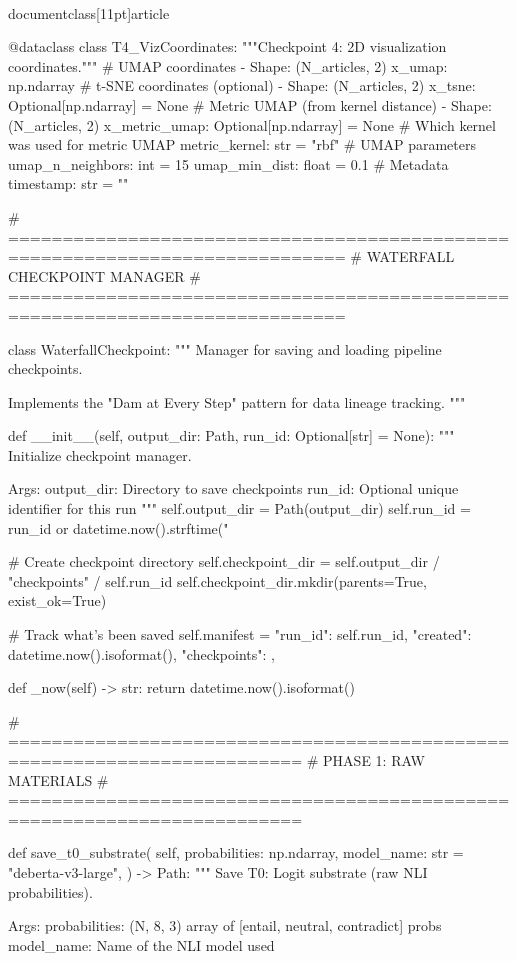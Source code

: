 \\documentclass[11pt]{article}
\begin{document}
\begin{CodeBlock}
@dataclass
class T4_VizCoordinates:
    """Checkpoint 4: 2D visualization coordinates."""
    # UMAP coordinates - Shape: (N_articles, 2)
    x_umap: np.ndarray
    # t-SNE coordinates (optional) - Shape: (N_articles, 2)
    x_tsne: Optional[np.ndarray] = None
    # Metric UMAP (from kernel distance) - Shape: (N_articles, 2)
    x_metric_umap: Optional[np.ndarray] = None
    # Which kernel was used for metric UMAP
    metric_kernel: str = "rbf"
    # UMAP parameters
    umap_n_neighbors: int = 15
    umap_min_dist: float = 0.1
    # Metadata
    timestamp: str = ""


# =============================================================================
# WATERFALL CHECKPOINT MANAGER
# =============================================================================

class WaterfallCheckpoint:
    """
    Manager for saving and loading pipeline checkpoints.

    Implements the "Dam at Every Step" pattern for data lineage tracking.
    """

    def __init__(self, output_dir: Path, run_id: Optional[str] = None):
        """
        Initialize checkpoint manager.

        Args:
            output_dir: Directory to save checkpoints
            run_id: Optional unique identifier for this run
        """
        self.output_dir = Path(output_dir)
        self.run_id = run_id or datetime.now().strftime("%

        # Create checkpoint directory
        self.checkpoint_dir = self.output_dir / "checkpoints" / self.run_id
        self.checkpoint_dir.mkdir(parents=True, exist_ok=True)

        # Track what's been saved
        self.manifest = {
            "run_id": self.run_id,
            "created": datetime.now().isoformat(),
            "checkpoints": {},
        }

    def _now(self) -> str:
        return datetime.now().isoformat()

    # =========================================================================
    # PHASE 1: RAW MATERIALS
    # =========================================================================

    def save_t0_substrate(
        self,
        probabilities: np.ndarray,
        model_name: str = "deberta-v3-large",
    ) -> Path:
        """
        Save T0: Logit substrate (raw NLI probabilities).

        Args:
            probabilities: (N, 8, 3) array of [entail, neutral, contradict] probs
            model_name: Name of the NLI model used


\end{CodeBlock}
\end{document}
